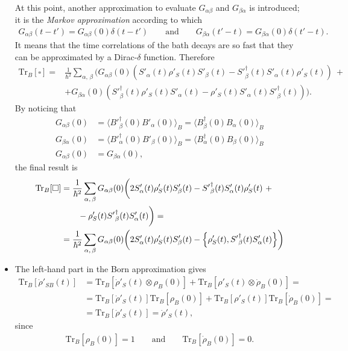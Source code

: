 \begin{itemize}
\begin{align}
    \label{eq:cos}
\end{align}
At this point, another approximation to evaluate $G_{\alpha \beta}$ and $G_{\beta \alpha}$ is introduced; it is the \textit{Markov approximation} according to which
\begin{align*}
    G_{\alpha \beta} (t-t') = G_{\alpha \beta}(0) \delta(t-t') \qquad \text{and} \qquad   G_{\beta \alpha} (t'-t) = G_{\beta \alpha}(0) \delta(t'-t).
\end{align*}
It means that the time correlations of the bath decays are so fast that they can be approximated by a Dirac-$\delta$ function. Therefore
\begin{align*}
    \text{Tr}_B [\square] =& \frac{1}{\hbar^2} \sum_{\alpha, \, \beta} \bigg( G_{\alpha \beta} (0) \left( S'_\alpha(t) \rho'_S(t) S'_\beta(t) - {S'}_\beta^\dagger(t) S'_\alpha(t) \rho'_S(t) \right) ~+ \\
    &+ G_{ \beta \alpha} (0) \left( {S'}_\beta^\dagger(t) \rho'_S(t) S'_\alpha(t) - \rho'_S(t) S'_\alpha(t) {S'}_\beta^\dagger(t) \right) \bigg).
\end{align*}
By noticing that 
\begin{align*}
    G_{\alpha \beta}(0) &= \langle {B'}_\beta^\dagger(0) B'_\alpha(0) \rangle_B = \langle B_\beta^\dagger(0) B_\alpha(0) \rangle_B \\
    G_{\beta \alpha}(0) &= \langle {B'}_\alpha^\dagger(0) B'_\beta(0) \rangle_B = \langle B_\alpha^\dagger(0) B_\beta(0) \rangle_B \\
    G_{\alpha \beta}(0) &= G_{\beta \alpha}(0),
\end{align*}
the final result is 
\begin{align*}
    \text{Tr}_B [\square] &= \frac{1}{\hbar^2} \sum_{\alpha, \,\beta}  G_{\alpha \beta} (0) \bigg( 2 S'_\alpha(t) \rho'_S(t) S'_\beta(t) - {S'}_\beta^\dagger(t) S'_\alpha(t) \rho'_S(t) ~+ \\
    & \qquad - \rho'_S(t) {S'}_\beta^\dagger(t) S'_\alpha(t)  \bigg) = \\
    &= \frac{1}{\hbar^2} \sum_{\alpha, \,\beta}  G_{\alpha \beta} (0) \bigg( 2 S'_\alpha(t) \rho'_S(t) S'_\beta(t) - \Bigl\{\rho'_S(t), {S'}_\beta^\dagger(t) S'_\alpha(t)\Bigr\} \bigg)
\end{align*}
\item The left-hand part in the Born approximation gives 
    \begin{align*}
        \text{Tr}_B \left[ \dot{\rho}'_{SB}(t) \right] &= \text{Tr}_B \left[ \dot{\rho}'_{S}(t)  \otimes \rho_B(0) \right] +  \text{Tr}_B \left[ {\rho}'_{S}(t)  \otimes \dot{\rho}_B(0) \right] = \\
        &= \text{Tr}_B \left[ \dot{\rho}'_{S}(t) \right] \text{Tr}_B \left[\rho_B(0) \right] + \text{Tr}_B \left[ {\rho}'_{S}(t) \right] \text{Tr}_B \left[ \dot{\rho}_B(0) \right] = \\
        &= \text{Tr}_B \left[ \dot{\rho}'_{S}(t) \right] = \dot{\rho}'_{S}(t),
    \end{align*}
    since 
    \begin{align*}
        \text{Tr}_B \left[\rho_B(0) \right] = 1 \qquad \text{and} \qquad \text{Tr}_B \left[ \dot{\rho}_B(0) \right] = 0. 
    \end{align*}
\end{itemize}
